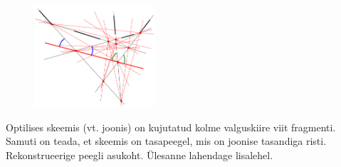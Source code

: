 \setAuthor{}

\begin{figure}
\vspace{-10pt}
	\begin{center}
		\includegraphics[width = 0.4\textwidth]{2019-v2g-02-yl.pdf}
	\end{center}
\end{figure}

Optilises skeemis (vt. joonis) on kujutatud kolme valguskiire viit fragmenti. Samuti on teada, et skeemis on tasapeegel, mis on joonise tasandiga risti. Rekonstrueerige peegli asukoht. Ülesanne lahendage lisalehel. 


\hint

